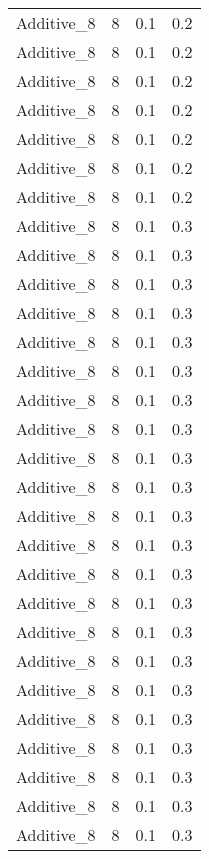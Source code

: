 \documentclass{article}
\begin{document}
\begin{longtable}[H]{lrrr}
 Additive\_8 &       8 &   0.1 &            0.2 \\
 Additive\_8 &       8 &   0.1 &            0.2 \\
 Additive\_8 &       8 &   0.1 &            0.2 \\
 Additive\_8 &       8 &   0.1 &            0.2 \\
 Additive\_8 &       8 &   0.1 &            0.2 \\
 Additive\_8 &       8 &   0.1 &            0.2 \\
 Additive\_8 &       8 &   0.1 &            0.2 \\
 Additive\_8 &       8 &   0.1 &            0.3 \\
 Additive\_8 &       8 &   0.1 &            0.3 \\
 Additive\_8 &       8 &   0.1 &            0.3 \\
 Additive\_8 &       8 &   0.1 &            0.3 \\
 Additive\_8 &       8 &   0.1 &            0.3 \\
 Additive\_8 &       8 &   0.1 &            0.3 \\
 Additive\_8 &       8 &   0.1 &            0.3 \\
 Additive\_8 &       8 &   0.1 &            0.3 \\
 Additive\_8 &       8 &   0.1 &            0.3 \\
 Additive\_8 &       8 &   0.1 &            0.3 \\
 Additive\_8 &       8 &   0.1 &            0.3 \\
 Additive\_8 &       8 &   0.1 &            0.3 \\
 Additive\_8 &       8 &   0.1 &            0.3 \\
 Additive\_8 &       8 &   0.1 &            0.3 \\
 Additive\_8 &       8 &   0.1 &            0.3 \\
 Additive\_8 &       8 &   0.1 &            0.3 \\
 Additive\_8 &       8 &   0.1 &            0.3 \\
 Additive\_8 &       8 &   0.1 &            0.3 \\
 Additive\_8 &       8 &   0.1 &            0.3 \\
 Additive\_8 &       8 &   0.1 &            0.3 \\
 Additive\_8 &       8 &   0.1 &            0.3 \\
 Additive\_8 &       8 &   0.1 &            0.3 \\

\end{longtable}
\end{document}
